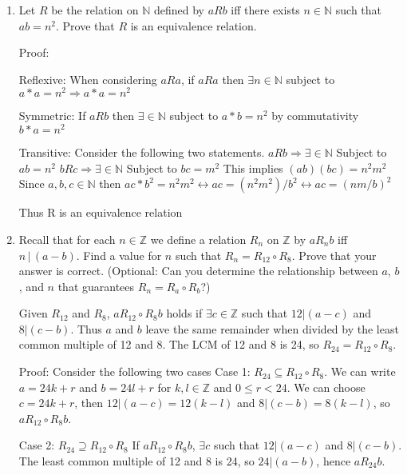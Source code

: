 \documentclass{article}
\newcommand{\bR}{\mathbb{R}}
\newcommand{\bZ}{\mathbb{Z}}
\newcommand{\bN}{\mathbb{N}}
\begin{document}
{\begin{enumerate}[labelindent=0pt,leftmargin=0pt]
    $\forall x, y \in \mathbb{R}$, $(x, y) \in R$ iff $x*y \geq 1$.

    This is not reflexive because it is not possible for x and y to both equal zero. 
    It is symmetric because $\forall x, y \in \mathbb{R}$ $xy = yx$
    It is transitive because $(a, b) \in\bR $ and $(b,c) \in\bR $ it is also true that $(a,c) \in\bR $ 

    \item Let $R$ be the relation on $\bN$ defined by $a R b$ iff there exists $n\in\bN$ such that $ab=n^2$. Prove that $R$ is an equivalence relation.

    Proof: 

    Reflexive: When considering $aRa$, if $aRa$ then $\exists n \in\bN$ subject to $a*a = n^2 \Rightarrow a*a = n^2$ 

    Symmetric: If $aRb$ then $\exists\in\bN$ subject to $a*b=n^2$ by commutativity $b*a = n^2$

    Transitive: Consider the following two statements. 
    $aRb \Rightarrow \exists \in \bN$ Subject to $ab=n^2$
    $bRc \Rightarrow \exists \in \bN$ Subject to $bc=m^2$
    This implies $(ab)(bc) = n^2m^2$
    Since $a,b,c \in\bN $ then $ac*b^2 = n^2m^2  \leftrightarrow  ac = (n^2m^2)/b^2  \leftrightarrow  ac = (nm/b)^2 $

    Thus R is an equivalence relation

    \item Recall that for each $n\in\bZ$ we define a relation $R_n$ on $\bZ$ by $a R_n b$ iff $n\,|\,(a-b)$. Find a value for $n$ such that $R_n=R_{12}\circ R_8$. Prove that your answer is correct. (Optional: Can you determine the relationship between $a$, $b$, and $n$ that guarantees $R_n=R_a\circ R_b$?)

    Given $R_{12}$ and $R_8$, $a R_{12}\circ R_8 b$ holds if $\exists c \in \mathbb{Z}$ such that $12|(a-c)$ and $8|(c-b)$. 
    Thus $a$ and $b$ leave the same remainder when divided by the least common multiple of 12 and 8. 
    The LCM of 12 and 8 is 24, so $R_{24}=R_{12}\circ R_8$. 

    Proof: Consider the following two cases 
    Case 1: $R_{24} \subseteq R_{12}\circ R_8$.  
    We can write $a = 24k + r$ and $b = 24l + r$ for $k, l \in\bZ$ and $0 \leq r < 24$. We can choose $c = 24k + r$, then $12|(a-c) = 12(k-l)$ and $8|(c-b) = 8(k-l)$, so $a R_{12}\circ R_8 b$.

    Case 2: $R_{24} \supseteq R_{12}\circ R_8$
    If $a R_{12}\circ R_8 b$, $\exists c$ such that $12|(a-c)$ and $8|(c-b)$. The least common multiple of 12 and 8 is 24, so $24|(a-b)$, hence $a R_{24} b$.


\end{enumerate}}
\end{document}
